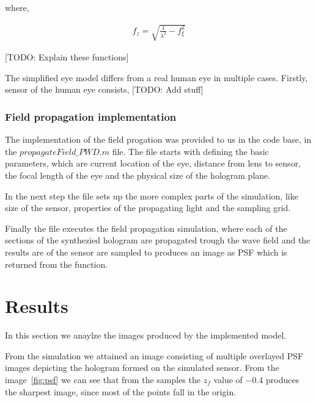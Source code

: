 \documentclass[12pt,a4paper,english
]{tunithesis}
\begin{document}
where,

\begin{align}
  \label{eq:focus}
  f_z = \sqrt{\frac{1}{\lambda^2} - f_\xi ^ 2}
\end{align}

[TODO: Explain these functions]

The simplified eye model differs from a real human eye in multiple cases. Firstly, sensor of the human eye consists, [TODO: Add stuff]

\subsection{Field propagation implementation}
The implementation of the field progation was provided to us in the code base, in the $propagateField\_PWD.m$ file. The file starts with defining the basic parameters, which are current location of the eye, distance from lens to sensor, the focal length of the eye and the physical size of the hologram plane.

In the next step the file sets up the more complex parts of the simulation, like size of the sensor, properties of the propagating light and the sampling grid.

Finally the file executes the field propagation simulation, where each of the sections of the synthezied hologram are propagated trough the wave field and the results are of the sensor are sampled to produces an image as PSF which is returned from the function.


\chapter{Results}
\label{sec:results}
In this section we anaylze the images produced by the implemented model.

From the simulation we attained an image consisting of multiple overlayed PSF images depicting the hologram formed on the simulated sensor. From the image~\ref{fig:psf} we can see that from the samples the $z_f$ value of $-0.4$ produces the sharpest image, since most of the points fall in the origin.
\end{document}
